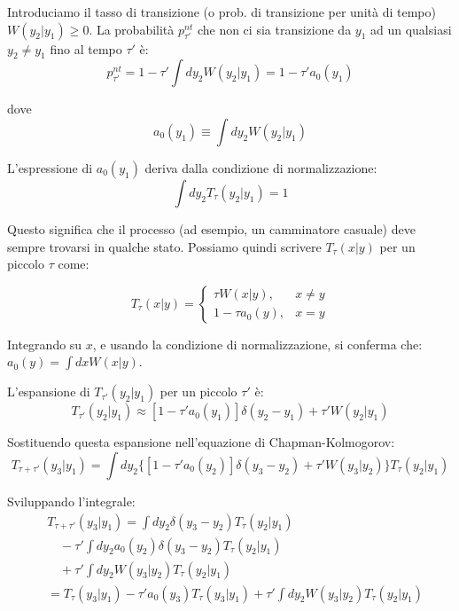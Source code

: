 Introduciamo il tasso di transizione (o prob. di transizione per unità di tempo) $W(y_2 | y_1) \ge 0$.
La probabilità $p_{\tau'}^{nt}$ che non ci sia transizione da $y_1$ ad un qualsiasi $y_2 \neq y_1$ fino al tempo $\tau'$ è:
\begin{equation}
p_{\tau'}^{nt} = 1 - \tau' \int dy_2 W(y_2 | y_1) = 1 - \tau' a_0(y_1)
\end{equation}


dove
\begin{equation}
a_0(y_1) \equiv \int dy_2 W(y_2 | y_1)
\end{equation}

L'espressione di $a_0(y_1)$ deriva dalla condizione di normalizzazione:
\begin{equation}
\int dy_2 T_{\tau}(y_2 | y_1) = 1
\end{equation}


Questo significa che il processo (ad esempio, un camminatore casuale) deve sempre trovarsi in qualche stato.
Possiamo quindi scrivere $T_{\tau}(x | y)$ per un piccolo $\tau$ come:

\begin{equation}
   T_{\tau}(x | y) = \begin{cases} \tau W(x | y), & x \ne y \\ 1 - \tau a_0(y), & x = y \end{cases} 
\end{equation}



Integrando su $x$, e usando la condizione di normalizzazione, si conferma che: $a_0(y) = \int dx W(x | y)$.

L'espansione di $T_{\tau'}(y_2 | y_1)$ per un piccolo $\tau'$ è:
\begin{equation}
T_{\tau'}(y_2 | y_1) \approx [1 - \tau' a_0(y_1)] \delta(y_2 - y_1) + \tau' W(y_2 | y_1)
\end{equation}


Sostituendo questa espansione nell'equazione di Chapman-Kolmogorov:
\begin{equation}
T_{\tau+\tau'}(y_3 | y_1) = \int dy_2 \{[1 - \tau' a_0(y_2)] \delta(y_3 - y_2) + \tau' W(y_3 | y_2)\} T_{\tau}(y_2 | y_1)
\end{equation}


Sviluppando l'integrale:
\begin{align}
&T_{\tau+\tau'}(y_3 | y_1) = \int dy_2 \delta(y_3 - y_2) T_{\tau}(y_2 | y_1) \nonumber \\
&\quad - \tau' \int dy_2 a_0(y_2) \delta(y_3 - y_2) T_{\tau}(y_2 | y_1) \nonumber \\
&\quad + \tau' \int dy_2 W(y_3 | y_2) T_{\tau}(y_2 | y_1) \nonumber \\
&= T_{\tau}(y_3 | y_1) - \tau' a_0(y_3) T_{\tau}(y_3 | y_1) + \tau' \int dy_2 W(y_3 | y_2) T_{\tau}(y_2 | y_1)
\end{align}

